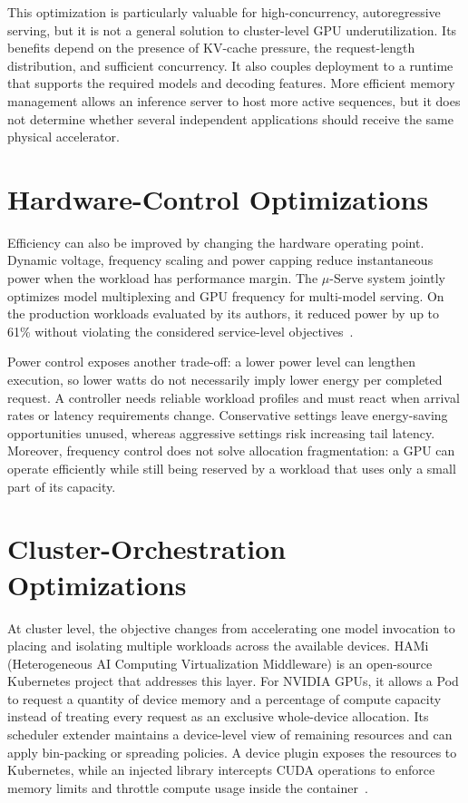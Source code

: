 This optimization is particularly valuable for high-concurrency, autoregressive serving, but it is not a general solution to cluster-level GPU underutilization. Its benefits depend on the presence of KV-cache pressure, the request-length distribution, and sufficient concurrency. It also couples deployment to a runtime that supports the required models and decoding features. More efficient memory management allows an inference server to host more active sequences, but it does not determine whether several independent applications should receive the same physical accelerator.

\section{Hardware-Control Optimizations}
\label{sec:sota-hardware-level}

Efficiency can also be improved by changing the hardware operating point. Dynamic voltage, frequency scaling and power capping reduce instantaneous power when the workload has performance margin. The $\mu$-Serve system jointly optimizes model multiplexing and GPU frequency for multi-model serving. On the production workloads evaluated by its authors, it reduced power by up to 61\% without violating the considered service-level objectives~\cite{qiu2024muserve}.

Power control exposes another trade-off: a lower power level can lengthen execution, so lower watts do not necessarily imply lower energy per completed request. A controller needs reliable workload profiles and must react when arrival rates or latency requirements change. Conservative settings leave energy-saving opportunities unused, whereas aggressive settings risk increasing tail latency. Moreover, frequency control does not solve allocation fragmentation: a GPU can operate efficiently while still being reserved by a workload that uses only a small part of its capacity.

\section{Cluster-Orchestration Optimizations}
\label{sec:sota-platform-level}

At cluster level, the objective changes from accelerating one model invocation to placing and isolating multiple workloads across the available devices. HAMi (Heterogeneous AI Computing Virtualization Middleware) is an open-source Kubernetes project that addresses this layer. For NVIDIA GPUs, it allows a Pod to request a quantity of device memory and a percentage of compute capacity instead of treating every request as an exclusive whole-device allocation. Its scheduler extender maintains a device-level view of remaining resources and can apply bin-packing or spreading policies. A device plugin exposes the resources to Kubernetes, while an injected library intercepts CUDA operations to enforce memory limits and throttle compute usage inside the container~\cite{hami2026virtualization}.


